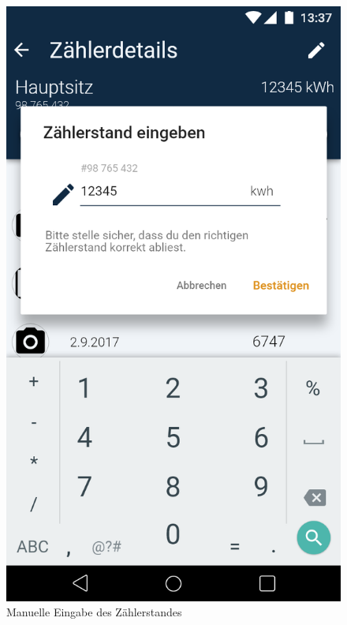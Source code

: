 \begin{figure}[h]
	\includegraphics[scale = 0.22]{img/AndroidMockup/manuelEntry}		
	\caption{Manuelle Eingabe des Zählerstandes}
	\label{fig:mock-pw}
\end{figure}

